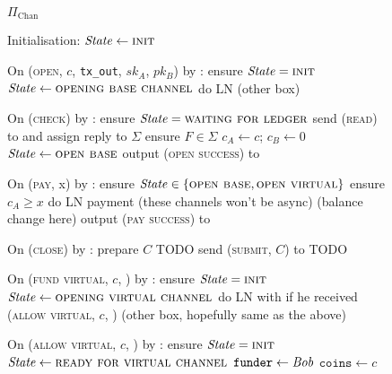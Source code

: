 \begin{figure}[H]
  \begin{protocolbox}{$\Pi_{\mathrm{Chan}}$}
    \begin{algorithmic}[1]
      \State Initialisation:
      \Indent
        \State $\mathit{State} \gets \textsc{init}$
      \EndIndent
      \Statex

      \State On (\textsc{open}, $c$, \texttt{tx\_out}, $sk_A$, $pk_B$) by
      \environment:
      \Indent
        \State ensure $\mathit{State} = \textsc{init}$
        \State $\mathit{State} \gets \textsc{opening base channel}$
        \State do LN (other box) %
      \EndIndent
      \Statex

      \State On (\textsc{check}) by \environment:
      \Indent
        \State ensure $\mathit{State} = \textsc{waiting for ledger}$
        \State send (\textsc{read}) to \ledger and assign reply to $\Sigma$
        \State ensure $F \in \Sigma$
        \State $c_A \gets c$; $c_B \gets 0$ 
        \State $\mathit{State} \gets \textsc{open base}$
        \State output (\textsc{open success}) to \environment
      \EndIndent
      \Statex

      \State On (\textsc{pay}, x) by \environment:
      \Indent
        \State ensure $\mathit{State} \in \{\textsc{open base}, \textsc{open
        virtual}\}$
        \State ensure $c_A \geq x$
        \State do LN payment (these channels won't be async) (balance change
        here) %
        \State output (\textsc{pay success}) to \environment
      \EndIndent
      \Statex

      \State On (\textsc{close}) by \environment:
      \Indent
          \State prepare $C$ TODO
          \State send (\textsc{submit}, $C$) to \ledger
          \State TODO
        \EndIf
      \EndIndent
      \Statex

      \State {}
      \State {}
      \State On (\textsc{fund virtual}, $c$, \bob) by \alice:
      \Indent
        \State ensure $\mathit{State} = \textsc{init}$
        \State $\mathit{State} \gets \textsc{opening virtual channel}$
        \State do LN with \bob if he received (\textsc{allow virtual}, $c$,
        \bob) (other box, hopefully same as the above) %
      \EndIndent
      \Statex

      \State {}
      \State On (\textsc{allow virtual}, $c$, \bob) by \alice:
      \Indent
        \State ensure $\mathit{State} = \textsc{init}$
        \State $\mathit{State} \gets \textsc{ready for virtual channel}$
        \State $\mathtt{funder} \gets \mathit{Bob}$
        \State $\mathtt{coins} \gets c$
      \EndIndent
      \Statex


\end{algorithmic}
\end{protocolbox}
\end{figure}
